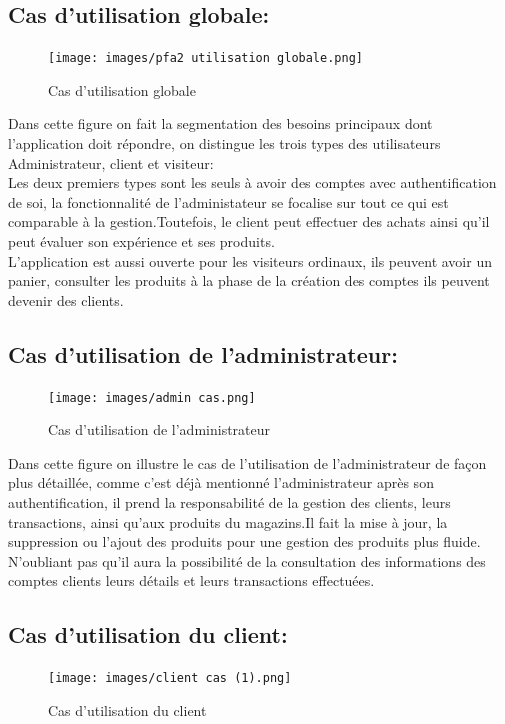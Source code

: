 \documentclass[a4paper,12pt]{report}
\begin{document}
\begin{doublespace}
\begin{doublespace}
\begin{doublespace}
\begin{doublespace}
\begin{doublespace}
\subsection{Cas d'utilisation globale:}
\begin{figure}[H]
\begin{center}
 \texttt{[image: images/pfa2 utilisation globale.png]}
 \caption{Cas d'utilisation globale}
 \end{center}
\end{figure}
\newpage
Dans cette figure on fait la segmentation des besoins principaux dont l'application doit répondre, on distingue les trois types des utilisateurs Administrateur, client et visiteur: \\Les deux premiers types sont les seuls à avoir des comptes avec authentification de soi, la fonctionnalité de l'administateur se focalise sur tout ce qui est comparable à la gestion.Toutefois, le client peut effectuer des achats ainsi qu'il peut évaluer son expérience et ses produits. \\ L'application est aussi ouverte pour les visiteurs ordinaux, ils peuvent avoir un panier, consulter les produits à la phase de la création des comptes ils peuvent devenir des clients.

\subsection{Cas d'utilisation de l'administrateur:}
\begin{figure}[H]
\begin{center}
 \texttt{[image: images/admin cas.png]}
 \caption{Cas d'utilisation de l'administrateur}
 \end{center}
\end{figure}
Dans cette figure on illustre le cas de l'utilisation de l'administrateur de façon plus détaillée, comme c'est déjà mentionné l'administrateur après son authentification, il prend la responsabilité de la gestion des clients, leurs transactions, ainsi qu'aux produits du magazins.Il fait la mise à jour, la suppression ou l'ajout des produits pour une gestion des produits plus fluide.\\ N'oubliant pas qu'il aura la possibilité de la consultation des informations des comptes clients leurs détails et leurs transactions effectuées.

\subsection{Cas d'utilisation du client:}
\begin{figure}[H]
\begin{center}
 \texttt{[image: images/client cas (1).png]}
 \caption{Cas d'utilisation du client}
 \end{center}
\end{figure}


\end{doublespace}
\end{doublespace}
\end{doublespace}
\end{doublespace}
\end{doublespace}
\end{document}
